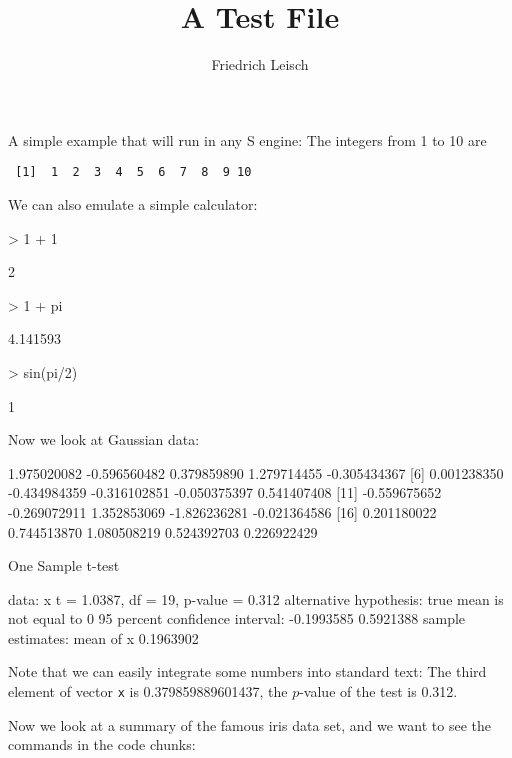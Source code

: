 \documentclass[a4paper]{article}
\title{A Test File}
\author{Friedrich Leisch}
\begin{document}
\maketitle

A simple example that will run in any S engine: The integers from 1 to
10 are
\begin{Verbatim}
 [1]  1  2  3  4  5  6  7  8  9 10
\end{Verbatim}

We can also emulate a simple calculator:
\begin{Schunk}
\begin{Sinput}
> 1 + 1
\end{Sinput}
\begin{Soutput}
[1] 2
\end{Soutput}
\begin{Sinput}
> 1 + pi
\end{Sinput}
\begin{Soutput}
[1] 4.141593
\end{Soutput}
\begin{Sinput}
> sin(pi/2)
\end{Sinput}
\begin{Soutput}
[1] 1
\end{Soutput}
\end{Schunk}

Now we look at Gaussian data:

\begin{Schunk}
\begin{Soutput}
 [1]  1.975020082 -0.596560482  0.379859890  1.279714455 -0.305434367
 [6]  0.001238350 -0.434984359 -0.316102851 -0.050375397  0.541407408
[11] -0.559675652 -0.269072911  1.352853069 -1.826236281 -0.021364586
[16]  0.201180022  0.744513870  1.080508219  0.524392703  0.226922429
\end{Soutput}
\begin{Soutput}
	One Sample t-test

data:  x 
t = 1.0387, df = 19, p-value = 0.312
alternative hypothesis: true mean is not equal to 0 
95 percent confidence interval:
 -0.1993585  0.5921388 
sample estimates:
mean of x 
0.1963902 
\end{Soutput}
\end{Schunk}
Note that we can easily integrate some numbers into standard text: The
third element of vector \texttt{x} is 0.379859889601437, the
$p$-value of the test is 0.312. %

Now we look at a summary of the famous iris data set, and we want to
see the commands in the code chunks:
\end{document}
